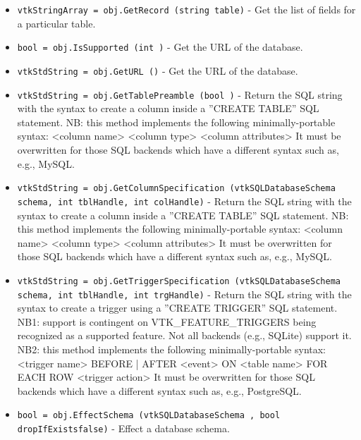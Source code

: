 \begin{itemize}
\item  \verb|vtkStringArray = obj.GetRecord (string table)| -  Get the list of fields for a particular table.

\item  \verb|bool = obj.IsSupported (int )| -  Get the URL of the database.

\item  \verb|vtkStdString = obj.GetURL ()| -  Get the URL of the database.

\item  \verb|vtkStdString = obj.GetTablePreamble (bool )| -  Return the SQL string with the syntax to create a column inside a
 ''CREATE TABLE'' SQL statement.
 NB: this method implements the following minimally-portable syntax:
 <column name> <column type> <column attributes>
 It must be overwritten for those SQL backends which have a different 
 syntax such as, e.g., MySQL.

\item  \verb|vtkStdString = obj.GetColumnSpecification (vtkSQLDatabaseSchema schema, int tblHandle, int colHandle)| -  Return the SQL string with the syntax to create a column inside a
 ''CREATE TABLE'' SQL statement.
 NB: this method implements the following minimally-portable syntax:
 <column name> <column type> <column attributes>
 It must be overwritten for those SQL backends which have a different 
 syntax such as, e.g., MySQL.

\item  \verb|vtkStdString = obj.GetTriggerSpecification (vtkSQLDatabaseSchema schema, int tblHandle, int trgHandle)| -  Return the SQL string with the syntax to create a trigger using a
 ''CREATE TRIGGER'' SQL statement.
 NB1: support is contingent on VTK\_FEATURE\_TRIGGERS being recognized as
 a supported feature. Not all backends (e.g., SQLite) support it.
 NB2: this method implements the following minimally-portable syntax:
 <trigger name> {BEFORE | AFTER} <event> ON <table name> FOR EACH ROW <trigger action>
 It must be overwritten for those SQL backends which have a different 
 syntax such as, e.g., PostgreSQL.

\item  \verb|bool = obj.EffectSchema (vtkSQLDatabaseSchema , bool dropIfExistsfalse)| -  Effect a database schema.

\end{itemize}
